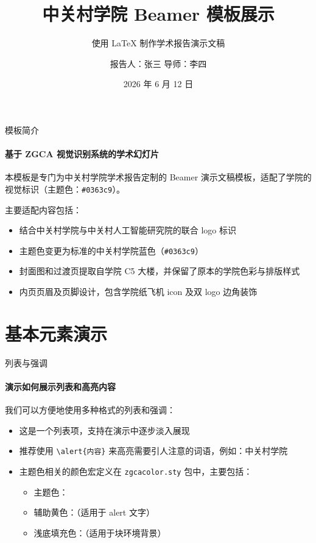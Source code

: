 \documentclass{beamer}
\title{中关村学院 Beamer 模板展示}
\subtitle{使用 LaTeX 制作学术报告演示文稿}
\author{报告人：张三 \quad 导师：李四}
\date{2026 年 6 月 12 日}
\begin{document}
\maketitle

\begin{frame}{模板简介}
\framesubtitle{基于 ZGCA 视觉识别系统的学术幻灯片}

本模板是专门为中关村学院学术报告定制的 Beamer 演示文稿模板，适配了学院的视觉标识（主题色：\texttt{\#0363c9}）。

\vspace{\baselineskip}

主要适配内容包括：
\begin{itemize}
    \item 结合中关村学院与中关村人工智能研究院的联合 logo 标识
    \item 主题色变更为标准的中关村学院蓝色（\texttt{\#0363c9}）
    \item 封面图和过渡页提取自学院 C5 大楼，并保留了原本的学院色彩与排版样式
    \item 内页页眉及页脚设计，包含学院纸飞机 icon 及双 logo 边角装饰
\end{itemize}

\end{frame}

\section{基本元素演示}

\begin{frame}[fragile]{列表与强调}
\framesubtitle{演示如何展示列表和高亮内容}

我们可以方便地使用多种格式的列表和强调：
\begin{itemize}
    \item 这是一个列表项，支持在演示中逐步淡入展现
    \item 推荐使用 \verb|\alert{内容}| 来高亮需要引人注意的词语，例如：\alert{中关村学院}
    \item 主题色相关的颜色宏定义在 \texttt{zgcacolor.sty} 包中，主要包括：
    \begin{itemize}
        \item 主题色：
        \item 辅助黄色：（适用于 alert 文字）
        \item 浅底填充色：（适用于块环境背景）
    \end{itemize}
\end{itemize}
\end{frame}
\end{document}
